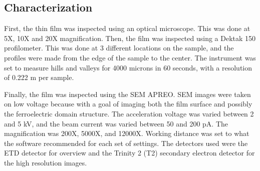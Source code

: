 \subsection{Characterization}

\noindent First, the thin film was inspected using an optical microscope. 
This was done at 5X, 10X and 20X magnification.
Then, the film was inspected using a Dektak 150 profilometer.
This was done at 3 different locations on the sample, and the profiles were made from the edge of the sample to the center.
The instrument was set to measure hills and valleys for 4000 microns in 60 seconds, with a resolution of 0.222 \textmu m per sample.

Finally, the film was inspected using the SEM APREO.
SEM images were taken on low voltage because with a goal of imaging both the film surface and possibly the ferroelectric domain structure.
The acceleration voltage was varied between 2 and 5 kV, and the beam current was varied between 50 and 200 pA.
The magnification was 200X, 5000X, and 12000X. 
Working distance was set to what the software recommended for each set of settings.
The detectors used were the ETD detector for overview and the Trinity 2 (T2) secondary electron detector for the high resolution images.